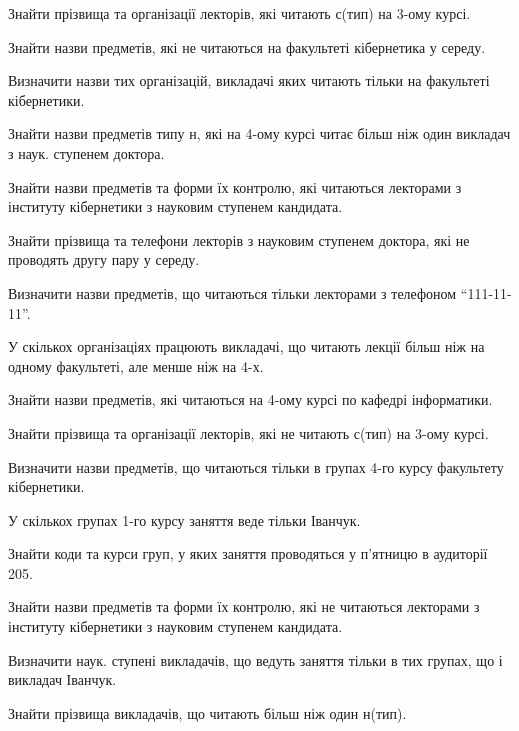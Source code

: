 \begin{card}
    \item Знайти прізвища та організації лекторів, які читають с (тип) на 3-ому курсі.
    \item Знайти назви предметів, які не читаються на факультеті кібернетика у середу.
    \item Визначити назви тих організацій, викладачі яких читають тільки на факультеті  кібернетики. 
    \item Знайти назви предметів типу н, які на 4-ому курсі читає більш ніж один викладач з наук. ступенем доктора.
\end{card}

\begin{card}
    \item Знайти назви предметів та форми їх контролю, які читаються лекторами з інституту кібернетики з науковим ступенем кандидата.
    \item Знайти прізвища та телефони лекторів з науковим ступенем доктора, які не проводять другу пару у середу.
    \item Визначити назви предметів, що читаються тільки лекторами з телефоном ``111-11-11''.
    \item У скількох організаціях працюють викладачі, що читають лекції більш ніж на одному факультеті, але менше ніж на 4-х.
\end{card}

\begin{card}
    \item Знайти назви предметів, які читаються на 4-ому курсі по кафедрі інформатики.
    \item Знайти прізвища та організації лекторів, які не читають с (тип) на 3-ому курсі.
    \item Визначити назви предметів, що читаються тільки в групах 4-го курсу факультету кібернетики.
    \item У скількох групах 1-го курсу заняття веде тільки Іванчук.
\end{card}

\begin{card}
    \item Знайти коди та курси груп, у яких заняття проводяться у п'ятницю в аудиторії 205.
    \item Знайти назви предметів та форми їх контролю, які не читаються лекторами з інституту кібернетики з науковим ступенем кандидата.
    \item Визначити наук. ступені викладачів, що ведуть заняття тільки в тих групах, що і викладач Іванчук.
    \item Знайти прізвища викладачів, що читають більш ніж один н (тип).
\end{card}

